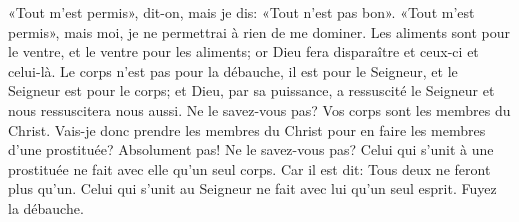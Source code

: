 «Tout m’est permis», dit-on,
	mais je dis: «Tout n'est pas bon».
«Tout m’est permis», mais moi, je ne permettrai à rien de me dominer.
Les aliments sont pour le ventre, et le ventre pour les aliments;
	or Dieu fera disparaître et ceux-ci et celui-là.
Le corps n’est pas pour la débauche, il est pour le Seigneur,
	et le Seigneur est pour le corps;
	et Dieu, par sa puissance, a ressuscité le Seigneur
		et nous ressuscitera nous aussi.
Ne le savez-vous pas?
	Vos corps sont les membres du Christ.
Vais-je donc prendre les membres du Christ
	pour en faire les membres d’une prostituée?
	Absolument pas!
Ne le savez-vous pas?
	Celui qui s’unit à une prostituée ne fait avec elle qu’un seul corps.
	Car il est dit: Tous deux ne feront plus qu’un.
Celui qui s’unit au Seigneur ne fait avec lui qu’un seul esprit.
	Fuyez la débauche.
